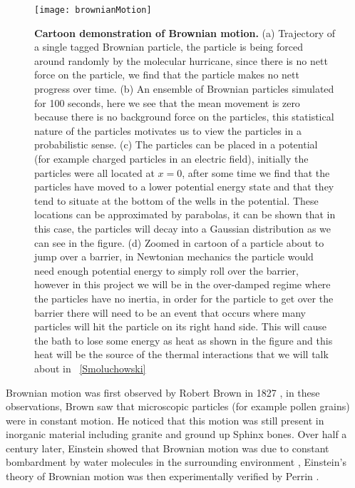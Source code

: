 \begin{figure}
	\texttt{[image: brownianMotion]}
	\caption{\textbf{Cartoon demonstration of Brownian motion.} (a) Trajectory of a single tagged Brownian particle, the particle is being forced around randomly by the molecular hurricane, since there is no nett force on the particle, we find that the particle makes no nett progress over time. (b) An ensemble of Brownian particles simulated for 100 seconds, here we see that the mean movement is zero because there is no background force on the particles, this statistical nature of the particles motivates us to view the particles in a probabilistic sense. (c) The particles can be placed in a potential (for example charged particles in an electric field), initially the particles were all located at $x = 0$, after some time we find that the particles have moved to a lower potential energy state and that they tend to situate at the bottom of the wells in the potential. These locations can be approximated by parabolas, it can be shown that in this case, the particles will decay into a Gaussian distribution \cite{UhlenbeckOrnstein1930} as we can see in the figure. (d) Zoomed in cartoon of a particle about to jump over a barrier, in Newtonian mechanics the particle would need enough potential energy to simply roll over the barrier, however in this project we will be in the over-damped regime where the particles have no inertia, in order for the particle to get over the barrier there will need to be an event that occurs where many particles will hit the particle on its right hand side. This will cause the bath to lose some energy as heat as shown in the figure and this heat will be the source of the thermal interactions that we will talk about in ~\autoref{Smoluchowski}  \label{fig:brownianMotion}}
\end{figure}


Brownian motion was first observed by Robert Brown in 1827 \cite{Brown1828}, in these observations, Brown saw that microscopic particles (for example pollen grains) were in constant motion. He noticed that this motion was still present in inorganic material including granite and ground up Sphinx bones.
Over half a century later, Einstein showed that Brownian motion was due to constant bombardment by water molecules in the surrounding environment \cite{Einstein1905}, Einstein's theory of Brownian motion was then experimentally verified by Perrin \cite{Perrin2013}.

